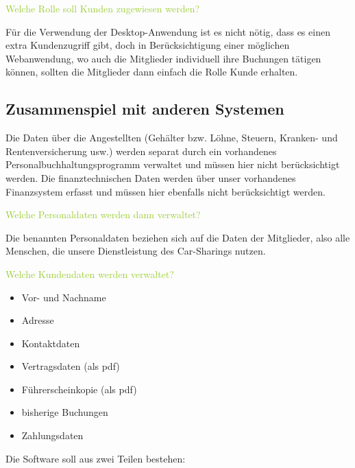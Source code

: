\textcolor{YellowGreen}{Welche Rolle soll Kunden zugewiesen werden?}

\textcolor{NavyBlue}{Für die Verwendung der Desktop-Anwendung ist es nicht nötig, dass es einen extra Kundenzugriff gibt, doch in Berücksichtigung einer möglichen Webanwendung, wo auch die Mitglieder individuell ihre Buchungen tätigen können, sollten die Mitglieder dann einfach die Rolle Kunde erhalten.}

\subsection{Zusammenspiel mit anderen Systemen}

Die Daten über die Angestellten (Gehälter bzw. Löhne, Steuern, Kranken- und Rentenversicherung usw.) werden separat durch ein vorhandenes Personalbuchhaltungsprogramm verwaltet und müssen hier nicht berücksichtigt werden. Die finanztechnischen Daten werden über unser vorhandenes Finanzsystem erfasst und müssen hier ebenfalls nicht berücksichtigt werden. 

\textcolor{YellowGreen}{Welche Personaldaten werden dann verwaltet?}

\textcolor{NavyBlue}{Die benannten Personaldaten beziehen sich auf die Daten der Mitglieder, also alle Menschen, die unsere Dienstleistung des Car-Sharings nutzen.}

\textcolor{YellowGreen}{Welche Kundendaten werden verwaltet?}

\textcolor{NavyBlue}{
    \begin{itemize}
        \item Vor- und Nachname
        \item Adresse
        \item Kontaktdaten
        \item Vertragsdaten (als pdf)
        \item Führerscheinkopie (als pdf)
        \item bisherige Buchungen
        \item Zahlungsdaten
    \end{itemize}
}

Die Software soll aus zwei Teilen bestehen:  

